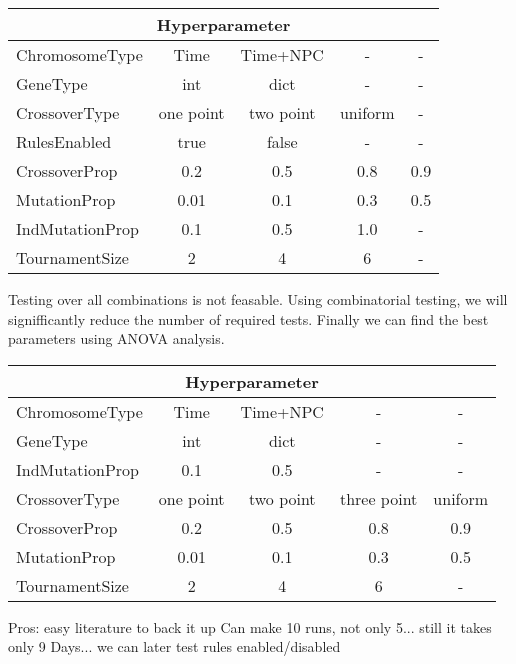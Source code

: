 \begin{tabular}{ |l||c|c|c|c|  }
	\hline
	\multicolumn{5}{|c|}{ Hyperparameter } \\
	\hline
	ChromosomeType   	& Time & Time+NPC & - & -\\
	GeneType			& int & dict & - & -\\
	CrossoverType 		& one point & two point & uniform & -\\
	RulesEnabled    	& true & false & - & -\\
	CrossoverProp    	& 0.2 & 0.5 & 0.8 & 0.9\\
	MutationProp   		& 0.01 & 0.1 & 0.3 & 0.5\\
	IndMutationProp		& 0.1 & 0.5 & 1.0 & -\\
	TournamentSize 		& 2 & 4 & 6 & -\\
	\hline
\end{tabular}

Testing over all combinations is not feasable. Using combinatorial testing, we will signifficantly reduce the number of required tests. Finally we can find the best parameters using ANOVA analysis.



\begin{tabular}{ |l||c|c|c|c|  }
	\hline
	\multicolumn{5}{|c|}{ Hyperparameter } \\
	\hline
	ChromosomeType   	& Time & Time+NPC & - & -\\
	GeneType			& int & dict & - & -\\
	IndMutationProp		& 0.1 & 0.5 & - & -\\
	CrossoverType 		& one point & two point & three point & uniform\\
	CrossoverProp    	& 0.2 & 0.5 & 0.8 & 0.9\\
	MutationProp   		& 0.01 & 0.1 & 0.3 & 0.5\\
	TournamentSize 		& 2 & 4 & 6 & -\\
	\hline
\end{tabular}



Pros:
easy
literature to back it up
Can make 10 runs, not only 5...
still it takes only 9 Days...
we can later test rules enabled/disabled


